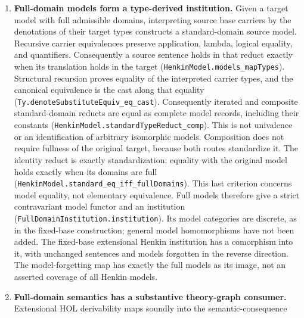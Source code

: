 \documentclass[11pt]{article}
\theoremstyle{definition}
\theoremstyle{remark}
\begin{document}
\begin{enumerate}
  its original sentence map is recovered. The existing finite extensional
  derivation closure gives a $\pi$-institution
  (\nolinkurl{HOLTypeDerivedConsequence.institution}), with its closed theories
  included through the existing theory-graph fibre. A concrete two-arrow
  interpretation changes both type expressions and numeric constant symbols
  and carries a beta theorem through this fibre. The incorrectly ordered
  symbol map is distinct, while sort collapse still fails to reflect
  consequence. No model-completeness premise is hidden in this
  proof-theoretic construction.
\item \textbf{Full-domain models form a type-derived institution.}
  Given a target model with full admissible domains, interpreting source
  base carriers by the denotations of their target types constructs a
  standard-domain source model. Recursive carrier equivalences preserve
  application, lambda, logical equality, and quantifiers. Consequently a
  source sentence holds in that reduct exactly when its translation holds
  in the target (\nolinkurl{HenkinModel.models_mapTypes}). Structural recursion
  proves equality of the interpreted carrier types, and the canonical
  equivalence is the cast along that equality
  (\nolinkurl{Ty.denoteSubstituteEquiv_eq_cast}). Consequently iterated and
  composite standard-domain reducts are equal as complete model records,
  including their constants (\nolinkurl{HenkinModel.standardTypeReduct_comp}).
  This is not univalence or an identification of arbitrary isomorphic models.
  Composition does not require fullness of the original target, because
  both routes standardize it. The identity reduct is exactly standardization;
  equality with the original model holds exactly when its domains are full
  (\nolinkurl{HenkinModel.standard_eq_iff_fullDomains}). This last criterion
  concerns model equality, not elementary equivalence.
  Full models therefore give a strict contravariant model functor and an
  institution (\nolinkurl{FullDomainInstitution.institution}). Its model
  categories are discrete, as in the fixed-base construction; general model
  homomorphisms have not been added. The fixed-base extensional Henkin
  institution has a comorphism into it, with unchanged sentences and models
  forgotten in the reverse direction. The model-forgetting map has exactly
  the full models as its image, not an asserted coverage of all Henkin models.
\item \textbf{Full-domain semantics has a substantive theory-graph consumer.}
  Extensional HOL derivability maps soundly into the semantic-consequence

\end{enumerate}
\end{document}
